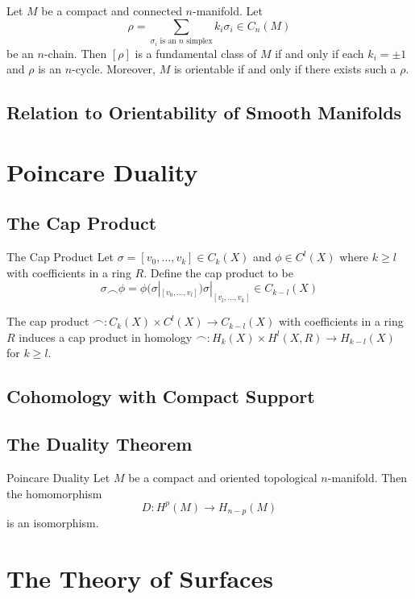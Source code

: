 \documentclass[a4paper]{article}
\begin{document}
\begin{prp}{}{} Let $M$ be a compact and connected $n$-manifold. Let $$\rho=\sum_{\sigma_i\text{ is an }n\text{ simplex}}k_i\sigma_i\in C_n(M)$$ be an $n$-chain. Then $[\rho]$ is a fundamental class of $M$ if and only if each $k_i=\pm 1$ and $\rho$ is an $n$-cycle. Moreover, $M$ is orientable if and only if there exists such a $\rho$. 
\end{prp}

\subsection{Relation to Orientability of Smooth Manifolds}

\pagebreak
\section{Poincare Duality}
\subsection{The Cap Product}
\begin{defn}{The Cap Product}{} Let $\sigma=[v_0,\dots,v_k]\in C_k(X)$ and $\phi\in C^l(X)$ where $k\geq l$ with coefficients in a ring $R$. Define the cap product to be $$\sigma\frown\phi=\phi(\sigma|_{[v_0,\dots,v_l]})\sigma|_{[v_l,\dots,v_k]}\in C_{k-l}(X)$$
\end{defn}

\begin{lmm}{}{} The cap product $\frown: C_k(X)\times C^l(X)\to C_{k-l}(X)$ with coefficients in a ring $R$ induces a cap product in homology $\frown: H_k(X)\times H^l(X,R)\to H_{k-l}(X)$ for $k\geq l$. 
\end{lmm}

\subsection{Cohomology with Compact Support}

\subsection{The Duality Theorem}
\begin{thm}{Poincare Duality}{} Let $M$ be a compact and oriented topological $n$-manifold. Then the homomorphism $$D:H^p(M)\to H_{n-p}(M)$$ is an isomorphism. 
\end{thm}

\pagebreak
\section{The Theory of Surfaces}
\end{document}

